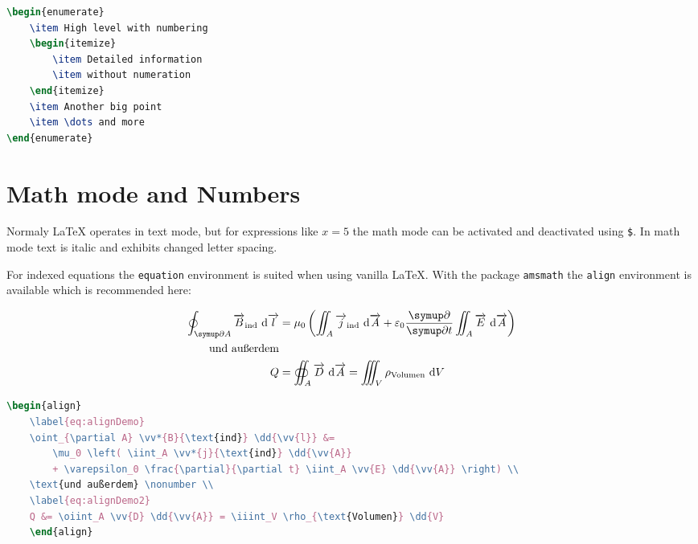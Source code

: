 \begin{lstlisting}[language=TeX]
\begin{enumerate}
	\item High level with numbering
	\begin{itemize}
		\item Detailed information
		\item without numeration
	\end{itemize}
	\item Another big point
	\item \dots and more
\end{enumerate}
\end{lstlisting}

\section{Math mode and Numbers}

	Normaly LaTeX operates in text mode, but for expressions like $x=5$ the math mode can be activated and deactivated using \verb|$|. In math mode text is italic and exhibits changed letter spacing.
	
	For indexed equations the \verb|equation| environment is suited when using vanilla LaTeX. With the package \verb|amsmath| the \verb|align| environment is available which is recommended here:
	
	\begin{align}
		\label{eq:alignDemo}
		\oint_{\partial A} \vect{B}_\text{ind} \dd{\vect{l}} &= \mu_0 \left( \iint_A \vect{j}_\text{ind} \dd{\vect{A}} + \varepsilon_0 \frac{\partial}{\partial t} \iint_A \vect{E} \dd{\vect{A}} \right) \\
		\text{und außerdem} \nonumber \\
		\label{eq:alignDemo2}
		Q &= \oiint_A \vect{D} \dd{\vect{A}} = \iiint_V \rho_{\text{Volumen}} \dd{V}
	\end{align}
	
	\begin{lstlisting}[language=TeX]
	\begin{align}
	\label{eq:alignDemo}
	\oint_{\partial A} \vv*{B}{\text{ind}} \dd{\vv{l}} &=
		\mu_0 \left( \iint_A \vv*{j}{\text{ind}} \dd{\vv{A}}
		+ \varepsilon_0 \frac{\partial}{\partial t} \iint_A \vv{E} \dd{\vv{A}} \right) \\
	\text{und außerdem} \nonumber \\
	\label{eq:alignDemo2}
	Q &= \oiint_A \vv{D} \dd{\vv{A}} = \iiint_V \rho_{\text{Volumen}} \dd{V}
	\end{align}
	\end{lstlisting}

